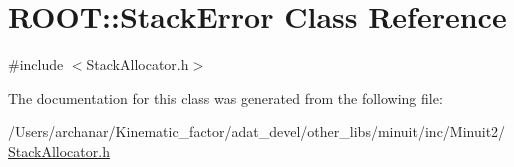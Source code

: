 \hypertarget{classROOT_1_1Minuit2_1_1StackError}{}\section{R\+O\+OT\+:\+:Stack\+Error Class Reference}
\label{classROOT_1_1Minuit2_1_1StackError}


{\ttfamily \#include $<$Stack\+Allocator.\+h$>$}



The documentation for this class was generated from the following file\+:\begin{DoxyCompactItemize}
\item 
/\+Users/archanar/\+Kinematic\+\_\+factor/adat\+\_\+devel/other\+\_\+libs/minuit/inc/\+Minuit2/\mbox{\hyperlink{other__libs_2minuit_2inc_2Minuit2_2StackAllocator_8h}{Stack\+Allocator.\+h}}\end{DoxyCompactItemize}
